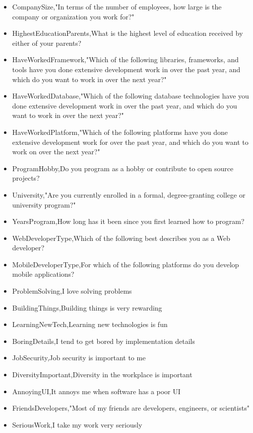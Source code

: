 \begin{appendices}
\begin{itemize}
        \item CompanySize,"In terms of the number of employees, how large is the company or organization you work for?"
        \item HighestEducationParents,What is the highest level of education received by either of your parents?
        \item HaveWorkedFramework,"Which of the following libraries, frameworks, and tools have you done extensive development work in over the past year, and which do you want to work in over the next year?"
        \item HaveWorkedDatabase,"Which of the following database technologies have you done extensive development work in over the past year, and which do you want to work in over the next year?"
        \item HaveWorkedPlatform,"Which of the following platforms have you done extensive development work for over the past year, and which do you want to work on over the next year?"
        \item ProgramHobby,Do you program as a hobby or contribute to open source projects?
        \item University,"Are you currently enrolled in a formal, degree-granting college or university program?"
        \item YearsProgram,How long has it been since you first learned how to program?
        \item WebDeveloperType,Which of the following best describes you as a Web developer?
        \item MobileDeveloperType,For which of the following platforms do you develop mobile applications?
        \item ProblemSolving,I love solving problems
        \item BuildingThings,Building things is very rewarding
        \item LearningNewTech,Learning new technologies is fun
        \item BoringDetails,I tend to get bored by implementation details
        \item JobSecurity,Job security is important to me
        \item DiversityImportant,Diversity in the workplace is important
        \item AnnoyingUI,It annoys me when software has a poor UI
        \item FriendsDevelopers,"Most of my friends are developers, engineers, or scientists"
        \item SeriousWork,I take my work very seriously

\end{itemize}
\end{appendices}
